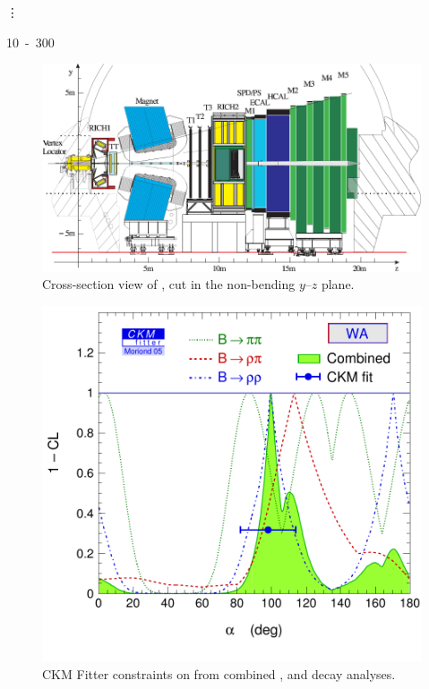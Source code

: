 \vspace{1cm}

\begin{center}
{\hspace{1mm}\Large\vdots\hspace{1cm}}
\end{center}

\vspace{1cm}

\unit{10-300}{\mrad}

\begin{figure}
  \begin{center}
  \includegraphics[width=0.8\textheight]{lhcb-detector-cross-section}
  \caption[Cross-section view of \LHCb, cut in the non-bending $y$--$z$ plane]%
    {Cross-section view of \LHCb, cut in the non-bending $y$--$z$ plane.}
  \label{fig:LHCbCrossSection}
  \end{center}
\end{figure}

\begin{figure}
  \includegraphics[width=\largefigwidth]{ckmfitter-alpha-combined}
  \caption[CKM Fitter constraints on \alphaCKM.]%
  {CKM Fitter constraints on \alphaCKM from combined \BToPiPi,
    \BToRhoPi and \BToRhoRho decay analyses.}
  \label{fig:CKMFitter}
\end{figure}

